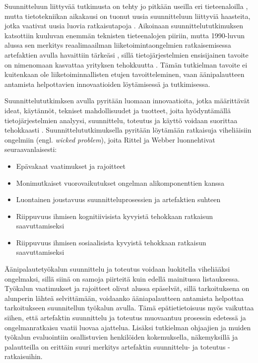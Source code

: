\documentclass[utf8]{gradu3}
\begin{document}
Suunnitteluun liittyvää tutkimusta on tehty jo pitkään useilla eri tieteenaloilla \parencite[][]{cross2001}, mutta tietotekniikan aikakausi on tuonut uusia suunnitteluun liittyviä haasteita, jotka vaativat uusia luovia ratkaisutapoja \parencite[][]{design}. Aikoinaan suunnittelututkimuksen katsottiin kuuluvan enemmän teknisten tieteenalojen piiriin, mutta 1990-luvun alussa sen merkitys reaalimaailman liiketoimintaongelmien ratkaisemisessa artefaktien avulla havaittiin tärkeäsi \parencite[][]{design}, sillä tietojärjestelmien ensisijainen tavoite on nimenomaan kasvattaa yrityksen tehokkuutta \parencite[][]{hevner2004}. Tämän tutkielman tavoite ei kuitenkaan ole liiketoiminnallisten etujen tavoitteleminen, vaan äänipalautteen antamista helpottavien innovaatioiden löytämisessä ja tutkimisessa.

Suunnittelututkimksen avulla pyritään luomaan innovaatioita, jotka määrittävät ideat, käytännöt, tekniset mahdollisuudet ja tuotteet, joita hyödyntämällä tietojärjestelmien analyysi, suunnittelu, toteutus ja käyttö voidaan suorittaa tehokkaasti \parencite[][]{hevner2004}. Suunnittelututkimuksella pyritään löytämään ratkaisuja viheliäisiin ongelmiin (engl. \textit{wicked problem}), joita Rittel ja Webber \parencite[][]{wicked} luonnehtivat seuraavanlaisesti: 

\begin{itemize}
  \item Epävakaat vaatimukset ja rajoitteet
  \item Monimutkaiset vuorovaikutukset ongelman alikomponenttien kanssa
  \item Luontainen joustavuus suunnitteluprosessien ja artefaktien suhteen
  \item Riippuvuus ihmisen kognitiivisista kyvyistä tehokkaan ratkaisun saavuttamiseksi
  \item Riippuvuus ihmisen sosiaalisista kyvyistä tehokkaan ratkaisun saavuttamiseksi
\end{itemize}

Äänipalautetyökalun suunnittelu ja toteutus voidaan luokitella viheliääksi ongelmaksi, sillä siinä on samoja piirteitä kuin edellä mainitussa listauksessa. Työkalun vaatimukset ja rajoitteet olivat alussa epäselvät, sillä tarkoituksena on alunperin lähteä selvittämään, voidaanko ääniapalautteen antamista helpottaa tarkoitukseen suunnitellun työkalun avulla. Tämä epätietietoisuus myös vaikuttaa siihen, että artefaktin suunnittelu ja toteutus muovaantuu prosessin edetessä ja ongelmanratkaisu vaatii luovaa ajattelua. Lisäksi tutkielman ohjaajien ja muiden työkalun evaluointiin osallistuvien henkilöiden kokemuksella, näkemyksillä ja palautteilla on erittäin suuri merkitys artefaktin suunnittelu- ja toteutus -ratkaisuihin.
\end{document}
